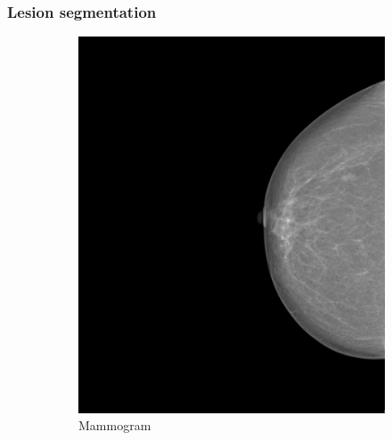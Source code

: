 \documentclass{beamer}
\begin{document}
	\begin{frame}
		\frametitle{Lesion segmentation}
		\begin{figure}[h]
			\centering
			\begin{subfigure}{0.35\textwidth}
				\includegraphics[width=\textwidth]{plots/mammogram.png}
				\caption{Mammogram}
			\end{subfigure}
			~
			\begin{subfigure}{0.35\textwidth}

\end{subfigure}
\end{figure}
\end{frame}
\end{document}
